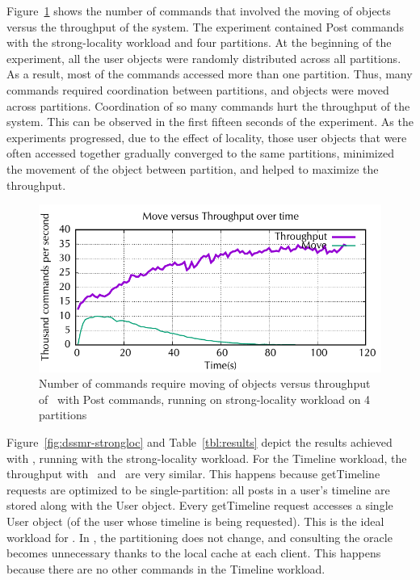 Figure~\ref{fig:dssmr-move-vs-tp-strong} shows the number of commands that
involved the moving of objects versus the throughput of the system.
The experiment contained Post commands with the strong-locality workload and four
partitions. At the beginning of the experiment, all the user
objects were randomly distributed across all partitions. As a result, most of the
commands accessed more than one partition. Thus, many commands required
coordination between partitions, and objects were moved across partitions. 
Coordination of so many commands hurt the throughput of the system. This can be observed in the
first fifteen seconds of the experiment. As the experiments progressed, due to the
effect of locality, those user objects that were often accessed together
gradually converged to the same partitions, minimized the movement of the object
between partition, and helped to maximize the throughput.

\begin{figure}[ht!]
\begin{minipage}[b]{1\linewidth}
\centering
      \includegraphics[width=0.6\linewidth]{figures/experiments/dssmr/move-vs-throughput}
\end{minipage}
\caption{Number of commands require moving of objects versus throughput of \dssmr\ with Post commands, running on strong-locality workload on 4 partitions}
\label{fig:dssmr-move-vs-tp-strong}
\end{figure}

Figure~\ref{fig:dssmr-strongloc} and Table~\ref{tbl:results} depict the
results achieved with \dssmrappname{}, running with the strong-locality workload.
For the Timeline workload, the throughput with \dssmr\ and \ssmr\ are very
similar. This happens because getTimeline requests are optimized to be
single-partition: all posts in a user's timeline are stored along with the User
object. Every getTimeline request accesses a single User object (of the user
whose timeline is being requested). This is the ideal workload for \ssmr{}. In
\dssmr{}, the partitioning does not change, and consulting the oracle becomes
unnecessary thanks to the local cache at each client. This happens because there
are no other commands in the Timeline workload.

